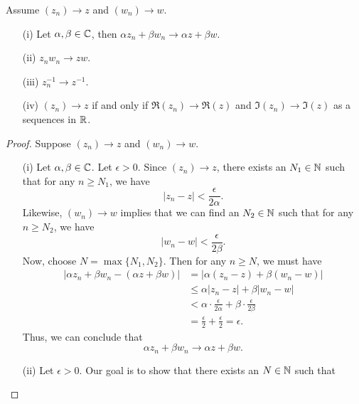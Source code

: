 \documentclass[a4paper]{report}
\begin{document}
\begin{prop}
   Assume \( ({z}_{n}) \to z  \) and \( ({w}_{n}) \to w   \). 
   \begin{enumerate}
       \item[(i)] Let \( \alpha, \beta \in \mathbb{C}  \), then \( \alpha {z}_{n} + \beta {w}_{n} \to \alpha z + \beta w  \).
        \item[(ii)] \( {z}_{n} {w}_{n} \to zw  \).
        \item[(iii)] \( {z}_{n}^{-1} \to z^{-1} \).
        \item[(iv)] \( ({z}_{n}) \to z  \) if and only if \( \Re({z}_{n}) \to \Re(z) \) and \( \Im({z}_{n}) \to \Im(z) \) as a sequences in \( \mathbb{R}  \).
   \end{enumerate}
\end{prop}
\begin{proof}
Suppose \( ({z}_{n}) \to z  \) and \( ({w}_{n}) \to w  \).
\begin{enumerate}
    \item[(i)] Let \( \alpha, \beta \in \mathbb{C}   \). Let \( \epsilon > 0  \). Since \( ({z}_{n}) \to z  \), there exists an \( {N}_{1} \in \mathbb{N}  \) such that for any \( n \geq {N}_{1} \), we have  
        \[  | {z}_{n} - z  |  < \frac{ \epsilon  }{ 2 \alpha }. \]
        Likewise, \( ({w}_{n}) \to w  \) implies that we can find an \( {N}_{2} \in \mathbb{N}  \) such that for any \( n \geq {N}_{2} \), we have
        \[  | {w}_{n} - w  |  < \frac{ \epsilon  }{ 2 \beta }. \]
        Now, choose \( N = \max \{ {N}_{1}, {N}_{2} \}  \). Then for any \( n \geq N  \), we must have 
        \begin{align*}
            | \alpha {z}_{n} + \beta {w}_{n} - (\alpha z + \beta w ) | &= |  \alpha ({z}_{n} - z ) + \beta ({w}_{n} - w )  |   \\
                                                                       &\leq \alpha | {z}_{n} - z | + \beta | {w}_{n} - w  | \\
                                                                       &< \alpha \cdot \frac{ \epsilon  }{ 2 \alpha }  + \beta \cdot \frac{ \epsilon  }{  2 \beta } \\
                                                                       &= \frac{ \epsilon  }{  2 }  + \frac{ \epsilon }{ 2 }  = \epsilon.
        \end{align*}
        Thus, we can conclude that 
        \[  \alpha {z}_{n} + \beta {w}_{n} \to \alpha z + \beta w.  \]
    \item[(ii)] Let \( \epsilon > 0  \). Our goal is to show that there exists an \( N \in \mathbb{N}  \) such that  

\end{enumerate}
\end{proof}
\end{document}
